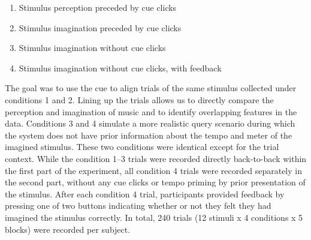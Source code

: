 {
\begin{enumerate}
\item
Stimulus perception preceded by cue clicks
\item
Stimulus imagination preceded by cue clicks
\item
Stimulus imagination without cue clicks
\item
Stimulus imagination without cue clicks, with feedback
\end{enumerate}
}
The goal was to use the cue to align trials of the same stimulus collected under conditions 1 and 2. Lining up the trials allows us to directly compare the perception and imagination of music and to identify overlapping features in the data. 
Conditions 3 and 4 simulate a more realistic query scenario during which the system does not have prior information about the tempo and meter of the imagined stimulus.
These two conditions were identical except for the trial context.
While the condition 1--3 trials were recorded directly back-to-back within the first part of the experiment, 
all condition 4 trials were recorded separately in the second part, without any cue clicks or tempo priming by prior presentation of the stimulus.
After each condition 4 trial, participants provided feedback by pressing one of two buttons indicating whether or not they felt they had imagined the stimulus correctly.
In total, 240 trials (12 stimuli x 4 conditions x 5 blocks) were recorded per subject.
%



